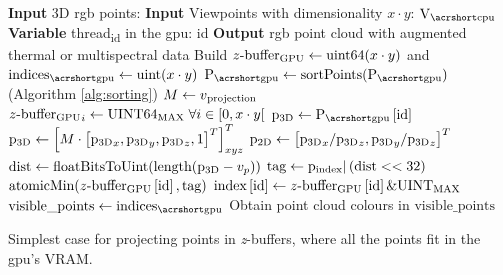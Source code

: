 \begin{algorithm}
      \small
      \begin{algorithmic}[1]
        \State \textbf{Input} 3D \acrshort{rgb} points: \Points %
    	\State \textbf{Input} Viewpoints with dimensionality $x \cdot y$: $\Viewpoints$ %
        \State \textbf{Variable} \textrm{thread}\textsubscript{id} in the \acrshort{gpu}: id %
        \State \textbf{Output} \acrshort{rgb} point cloud with augmented thermal or multispectral data %
        \State Build $z\textrm{-buffer}\textsubscript{GPU} \gets \textrm{uint64}(x \cdot y)$ and $\Indices \gets \textrm{uint}(x \cdot y)$ %
            \State $\Points \gets \textrm{sortPoints}(\Points)$   \Comment(Algorithm \ref{alg:sorting}) %
        \EndIf
                \State $M \gets v\textsubscript{projection}$ %
                    \State $z\textrm{-buffer}\textsubscript{GPU}_{i} \gets \textrm{UINT64\textsubscript{MAX}} \hspace{1mm} \forall i \in \left[0, x \cdot y\right[$ %
                \EndProcedure
                    \State $\Pointa \gets \Points\left[\textrm{id}\right]$ %
                    \State $\textrm{p}\textsubscript{3D} \gets \left[M \cdot \left[\textrm{p}\textsubscript{3D}_x, \textrm{p}\textsubscript{3D}_y, \textrm{p}\textsubscript{3D}_z, 1\right]^T\right]_{xyz}^T$ %
                    \State $\textrm{p}\textsubscript{2D} \gets \left[\textrm{p}\textsubscript{3D}_x / \textrm{p}\textsubscript{3D}_z, \textrm{p}\textsubscript{3D}_y / \textrm{p}\textsubscript{3D}_z\right]^T$ %
                        \State $\textrm{dist} \gets \textrm{floatBitsToUint}(\textrm{length}(\textrm{p}\textsubscript{3D} - v_p))$ %
                        \State $\textrm{tag} \gets \textrm{p}\textsubscript{index} | \left(\textrm{dist} << 32\right)$ %
                        \State $\textrm{atomicMin}(z\textrm{-buffer}\textsubscript{GPU}\left[\textrm{id}\right], \textrm{tag})$ %
                    \EndIf
                \EndProcedure
                    \State $\textrm{index}\left[\textrm{id}\right] \gets z\textrm{-buffer}\textsubscript{GPU}\left[\textrm{id}\right] \& \textrm{UINT\textsubscript{MAX}}$ %
                \EndProcedure
                \State $\textrm{visible\_points} \gets \Indices$ %
                \State Obtain point cloud colours in $\textrm{visible\_points}$ %
            \EndFor
        \EndProcedure
        \caption{Simplest case for projecting points in \textit{z}-buffers, where all the points fit in the \acrshort{gpu}'s VRAM.}
        \label{alg:gpu_single_batch}
      \end{algorithmic}
      \normalsize
\end{algorithm}

